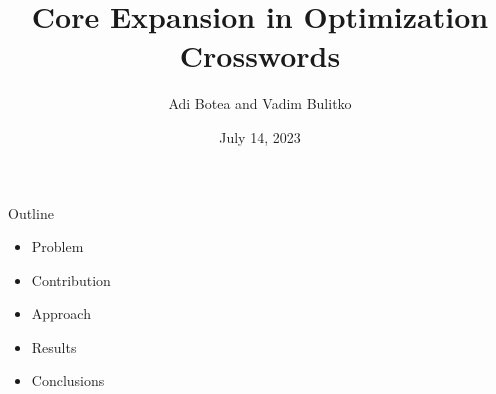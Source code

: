 \documentclass[aspectratio=169,usenames,dvipsnames]{beamer}
\newcommand{\bei}{\begin{itemize}}
\newcommand{\eei}{\end{itemize}}
\newcommand{\ie}{\item}
\numberwithin{equation}{section}
\numberwithin{theorem}{section}
\numberwithin{lem}{section}
\numberwithin{df}{section}
\begin{document}
\title{Core Expansion in Optimization Crosswords}
\author{Adi Botea and Vadim Bulitko}

\date{July 14, 2023}

\frame{\titlepage} 


\begin{frame}{Outline}

\bei

\ie Problem

\bigskip

\ie Contribution

\bigskip

\ie Approach

\bigskip

\ie Results

\bigskip

\ie Conclusions

\eei

\end{frame}

\end{document}

